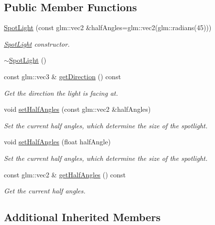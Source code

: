 \subsection*{Public Member Functions}
\begin{DoxyCompactItemize}
\item 
\mbox{\hyperlink{classec_1_1_spot_light_a52800f7bbfacd2e5a4ef2f3f6696cb46}{Spot\+Light}} (const glm\+::vec2 \&half\+Angles=glm\+::vec2(glm\+::radians(45)))
\begin{DoxyCompactList}\small\item\em \mbox{\hyperlink{classec_1_1_spot_light}{Spot\+Light}} constructor. \end{DoxyCompactList}\item 
\mbox{\hyperlink{classec_1_1_spot_light_adc9a1ffa198252e085c6862c063c8263}{$\sim$\+Spot\+Light}} ()
\item 
const glm\+::vec3 \& \mbox{\hyperlink{classec_1_1_spot_light_a373e8b5dc16c19fb7a0ba8ea5333f551}{get\+Direction}} () const
\begin{DoxyCompactList}\small\item\em Get the direction the light is facing at. \end{DoxyCompactList}\item 
void \mbox{\hyperlink{classec_1_1_spot_light_a70ee7996e77f4961cca8864cea037906}{set\+Half\+Angles}} (const glm\+::vec2 \&half\+Angles)
\begin{DoxyCompactList}\small\item\em Set the current half angles, which determine the size of the spotlight. \end{DoxyCompactList}\item 
void \mbox{\hyperlink{classec_1_1_spot_light_a0b9a13abe376b5e0513f243036b41af9}{set\+Half\+Angles}} (float half\+Angle)
\begin{DoxyCompactList}\small\item\em Set the current half angles, which determine the size of the spotlight. \end{DoxyCompactList}\item 
const glm\+::vec2 \& \mbox{\hyperlink{classec_1_1_spot_light_a1f53e54ee38973a55438c0321b78b439}{get\+Half\+Angles}} () const
\begin{DoxyCompactList}\small\item\em Get the current half angles. \end{DoxyCompactList}\end{DoxyCompactItemize}
\subsection*{Additional Inherited Members}


